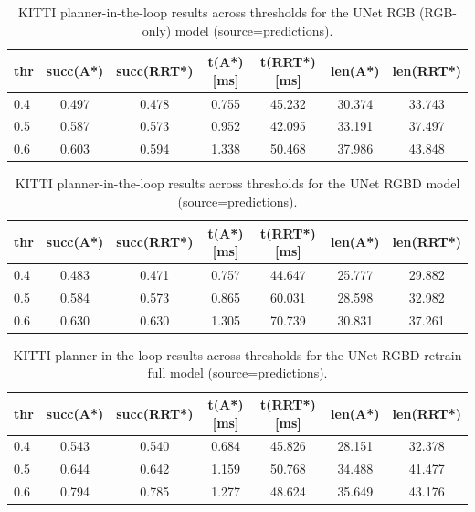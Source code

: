 \begin{table}[H]
  \centering
  \caption{KITTI planner-in-the-loop results across thresholds for the UNet RGB (RGB-only) model (source=predictions).}
  \label{tab:kitti_planner_pred_unet_rgb}
  \begin{tabular}{lcccccc}
    \toprule
    thr & succ(A*) & succ(RRT*) & t(A*) [ms] & t(RRT*) [ms] & len(A*) & len(RRT*) \\
    \midrule
    0.4 & 0.497 & 0.478 & 0.755 & 45.232 & 30.374 & 33.743 \\
    0.5 & 0.587 & 0.573 & 0.952 & 42.095 & 33.191 & 37.497 \\
    0.6 & 0.603 & 0.594 & 1.338 & 50.468 & 37.986 & 43.848 \\
    \bottomrule
  \end{tabular}
\end{table}

\begin{table}[H]
  \centering
  \caption{KITTI planner-in-the-loop results across thresholds for the UNet RGBD model (source=predictions).}
  \label{tab:kitti_planner_pred_unet_rgbd}
  \begin{tabular}{lcccccc}
    \toprule
    thr & succ(A*) & succ(RRT*) & t(A*) [ms] & t(RRT*) [ms] & len(A*) & len(RRT*) \\
    \midrule
    0.4 & 0.483 & 0.471 & 0.757 & 44.647 & 25.777 & 29.882 \\
    0.5 & 0.584 & 0.573 & 0.865 & 60.031 & 28.598 & 32.982 \\
    0.6 & 0.630 & 0.630 & 1.305 & 70.739 & 30.831 & 37.261 \\
    \bottomrule
  \end{tabular}
\end{table}

\begin{table}[H]
  \centering
  \caption{KITTI planner-in-the-loop results across thresholds for the UNet RGBD retrain full model (source=predictions).}
  \label{tab:kitti_planner_pred_unet_rgbd_retrain_full}
  \begin{tabular}{lcccccc}
    \toprule
    thr & succ(A*) & succ(RRT*) & t(A*) [ms] & t(RRT*) [ms] & len(A*) & len(RRT*) \\
    \midrule
    0.4 & 0.543 & 0.540 & 0.684 & 45.826 & 28.151 & 32.378 \\
    0.5 & 0.644 & 0.642 & 1.159 & 50.768 & 34.488 & 41.477 \\
    0.6 & 0.794 & 0.785 & 1.277 & 48.624 & 35.649 & 43.176 \\
    \bottomrule
  \end{tabular}
\end{table}

